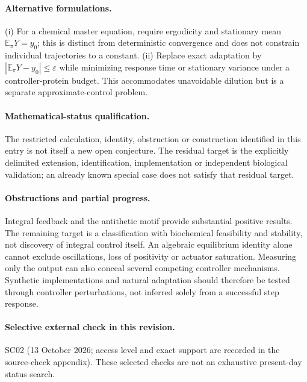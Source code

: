 \documentclass[11pt]{article}
\begin{document}
\paragraph{Alternative formulations.} (i) For a chemical master equation, require ergodicity and stationary mean $\mathbb{E}_\pi Y=y_0$; this is distinct from deterministic convergence and does not constrain individual trajectories to a constant. (ii) Replace exact adaptation by $|\mathbb{E}_\pi Y-y_0|\le\varepsilon$ while minimizing response time or stationary variance under a controller-protein budget. This accommodates unavoidable dilution but is a separate approximate-control problem.
\paragraph{Mathematical-status qualification.} The restricted calculation, identity, obstruction or construction identified in this entry is not itself a new open conjecture. The residual target is the explicitly delimited extension, identification, implementation or independent biological validation; an already known special case does not satisfy that residual target.

\paragraph{Obstructions and partial progress.} Integral feedback and the antithetic motif provide substantial positive results. The remaining target is a classification with biochemical feasibility and stability, not discovery of integral control itself. An algebraic equilibrium identity alone cannot exclude oscillations, loss of positivity or actuator saturation. Measuring only the output can also conceal several competing controller mechanisms. Synthetic implementations and natural adaptation should therefore be tested through controller perturbations, not inferred solely from a successful step response.
\paragraph{Selective external check in this revision.} SC02 (13 October 2026; access level and exact support are recorded in the source-check appendix). These selected checks are not an exhaustive present-day status search.
\end{document}
